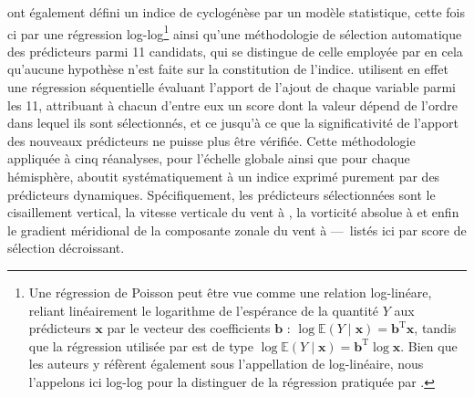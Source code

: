 \documentclass[../main.tex]{subfiles}
\begin{document}
\textcite{wang_dynamic_2020} ont également défini un indice de cyclogénèse par un modèle statistique, cette fois ci par une régression log-log\footnote{Une
régression de Poisson peut être vue comme une relation log-linéare, reliant linéairement le logarithme de l'espérance de la quantité $Y$ aux prédicteurs
$\mathbf{x}$ par le vecteur des coefficients $\mathbf{b}$ : $\log \mathbb{E} (Y \mid \mathbf{x}) = \mathbf{b}^{\mathrm{T}} \mathbf{x}$, tandis que la
régression utilisée par \textcite{wang_dynamic_2020} est de type $\log \mathbb{E}(Y \mid \mathbf{x}) = \mathbf{b}^{\mathrm{T}} \log \mathbf{x}$. Bien que
les auteurs y réfèrent également sous l'appellation de log-linéaire, nous l'appelons ici log-log pour la distinguer de la régression pratiquée par
\citeauthor{tippett_poisson_2011}.} ainsi qu'une méthodologie de sélection automatique des prédicteurs parmi \num{11} candidats, qui se distingue de celle
employée par \citeauthor{tippett_poisson_2011} en cela qu'aucune hypothèse n'est faite sur la constitution de l'indice. \citeauthor{wang_dynamic_2020} utilisent
en effet une régression séquentielle évaluant l'apport de l'ajout de chaque variable parmi les \num{11}, attribuant à chacun d'entre eux un score dont la valeur
dépend de l'ordre dans lequel ils sont sélectionnés, et ce jusqu'à ce que la significativité de l'apport des nouveaux prédicteurs ne puisse plus être vérifiée.
Cette méthodologie appliquée à cinq réanalyses, pour l'échelle globale ainsi que pour chaque hémisphère, aboutit systématiquement à un indice exprimé purement
par des prédicteurs dynamiques. Spécifiquement, les prédicteurs sélectionnées sont le cisaillement vertical, la vitesse verticale du vent à , la
vorticité absolue à  et enfin le gradient méridional de la composante zonale du vent à  ---~listés ici par score de sélection décroissant.
\end{document}

